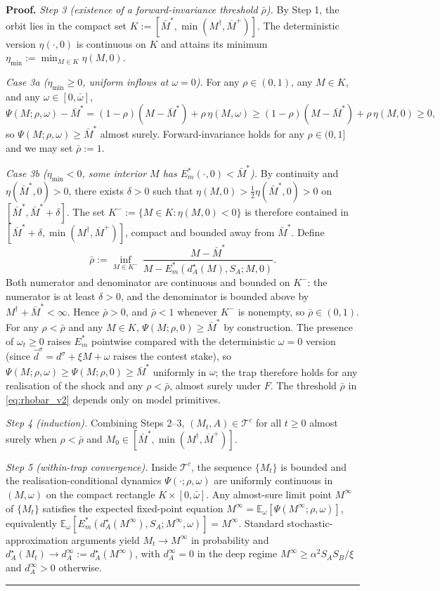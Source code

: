 \documentclass[11pt,twoside]{extarticle}
\newenvironment{proof}[1][Proof]{\noindent \textbf{#1.} }{\ \rule{0.5em}{0.5em}}
\begin{document}
\begin{proof}
\textit{Step 3 (existence of a forward-invariance threshold $\bar\rho$).}
By Step 1, the orbit lies in the compact set $K:=[\bar M^*,\min(M^\dagger,\overline M^+)]$. The deterministic version $\eta(\cdot,0)$ is continuous on $K$ and attains its minimum $\eta_{\min}:=\min_{M\in K}\eta(M,0)$.

\textit{Case 3a ($\eta_{\min}\ge 0$, uniform inflows at $\omega=0$).} For any $\rho\in(0,1)$, any $M\in K$, and any $\omega\in[0,\bar\omega]$,
\[
\Psi(M;\rho,\omega)-\bar M^* = (1-\rho)(M-\bar M^*) + \rho\,\eta(M,\omega) \ge (1-\rho)(M-\bar M^*) + \rho\,\eta(M,0) \ge 0,
\]
so $\Psi(M;\rho,\omega)\ge\bar M^*$ almost surely. Forward-invariance holds for any $\rho\in(0,1]$ and we may set $\bar\rho:=1$.

\textit{Case 3b ($\eta_{\min}<0$, some interior $M$ has $E_m^*(\cdot,0)<\bar M^*$).} By continuity and $\eta(\bar M^*,0)>0$, there exists $\delta>0$ such that $\eta(M,0)>\tfrac12\eta(\bar M^*,0)>0$ on $[\bar M^*,\bar M^*+\delta]$. The set $K^-:=\{M\in K:\eta(M,0)<0\}$ is therefore contained in $[\bar M^*+\delta,\min(M^\dagger,\overline M^+)]$, compact and bounded away from $\bar M^*$. Define
\begin{equation}\label{eq:rhobar_v2}
\bar\rho := \inf_{M\in K^-}\,\frac{M-\bar M^*}{M-E_m^*(d_A^\star(M),S_A;M,0)}.
\end{equation}
Both numerator and denominator are continuous and bounded on $K^-$: the numerator is at least $\delta>0$, and the denominator is bounded above by $M^\dagger+\bar M^*<\infty$. Hence $\bar\rho>0$, and $\bar\rho<1$ whenever $K^-$ is nonempty, so $\bar\rho\in(0,1)$. For any $\rho<\bar\rho$ and any $M\in K$, $\Psi(M;\rho,0)\ge\bar M^*$ by construction. The presence of $\omega_t\ge 0$ raises $E_m^*$ pointwise compared with the deterministic $\omega=0$ version (since $\hat d^\sigma=d^\sigma+\xi M+\omega$ raises the contest stake), so $\Psi(M;\rho,\omega)\ge\Psi(M;\rho,0)\ge\bar M^*$ uniformly in $\omega$; the trap therefore holds for any realisation of the shock and any $\rho<\bar\rho$, almost surely under $F$. The threshold $\bar\rho$ in \autoref{eq:rhobar_v2} depends only on model primitives.

\textit{Step 4 (induction).} Combining Steps 2--3, $(M_t,A)\in\mathcal T^c$ for all $t\ge 0$ almost surely when $\rho<\bar\rho$ and $M_0\in[\bar M^*,\min(M^\dagger,\overline M^+)]$.

\textit{Step 5 (within-trap convergence).} Inside $\mathcal T^c$, the sequence $\{M_t\}$ is bounded and the realisation-conditional dynamics $\Psi(\cdot;\rho,\omega)$ are uniformly continuous in $(M,\omega)$ on the compact rectangle $K\times[0,\bar\omega]$. Any almost-sure limit point $M^\infty$ of $\{M_t\}$ satisfies the expected fixed-point equation $M^\infty=\mathbb E_\omega[\Psi(M^\infty;\rho,\omega)]$, equivalently $\mathbb E_\omega[E_m^*(d_A^\star(M^\infty),S_A;M^\infty,\omega)]=M^\infty$. Standard stochastic-approximation arguments \citep{borkarStochasticApproximation2008} yield $M_t\to M^\infty$ in probability and $d_A^\star(M_t)\to d_A^\infty:=d_A^\star(M^\infty)$, with $d_A^\infty=0$ in the deep regime $M^\infty\ge\alpha^2 S_A S_B/\xi$ and $d_A^\infty>0$ otherwise.
\end{proof}
\end{document}
